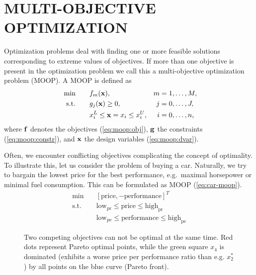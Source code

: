 \documentclass[%
reprint,
amsmath,amssymb,
aps,
]{revtex4-1}
\begin{document}
\section{MULTI-OBJECTIVE OPTIMIZATION} \label{sec:optimization}

Optimization problems deal with finding one or more feasible solutions
  corresponding to extreme values of objectives.
If more than one objective is present in the optimization problem we call this
  a multi-objective optimization problem (MOOP).
A MOOP is defined as
%
\begin{align}
  \text{ min} \quad & \quad f_m({\bf x}), ~& m &= 1, \dots, M, \label{eq:moop:obj}\\
  \text{s.t.} \quad & \quad g_j({\bf x}) \geq 0, & j &= 0, \dots, J,
  \label{eq:moop:constr}\\
  \quad & \quad  x_i^L \leq {\bf x}=x_i \leq x_i^U,& i &=0, \dots, n
  \label{eq:moop:dvar} \text{,}
\end{align}
%
where $\bf f$ denotes the objectives (\ref{eq:moop:obj}),
  $\bf g$ the constraints (\ref{eq:moop:constr}),
  and $\bf x$ the design variables (\ref{eq:moop:dvar}).

Often, we encounter conflicting objectives complicating the concept of
  optimality.
To illustrate this, let us consider the problem of buying a car.
Naturally, we try to bargain the lowest price for the best performance,
  e.g.\ maximal horsepower or minimal fuel consumption.
This can be formulated as MOOP (\ref{eq:car-moop}).
%
\begin{equation}
  \begin{array}{cl}
  \min          & \quad \left[ \text{price}, -\text{performance} \right]^T \\
    \text{s.t.} & \quad \text{low}_\text{pr} \leq \text{price} \leq \text{high}_\text{pr}\\
                & \quad \text{low}_\text{pe} \leq \text{performance} \leq \text{high}_\text{pe}
  \end{array}
  \label{eq:car-moop}
\end{equation}

\begin{figure}
  \begin{center}
    \begin{tikzpicture}[scale=1.3, transform shape]
      
    \end{tikzpicture}
  \end{center}
  \caption{Two competing objectives can not be optimal at the same time.
    Red dots represent Pareto optimal points, while the green square $x_4$ is
    dominated (exhibits a worse price per performance ratio than e.g. $x_2^*$)
    by all points on the blue curve (Pareto front).
  }
  \label{fig:tradeoff}
\end{figure}
\end{document}
